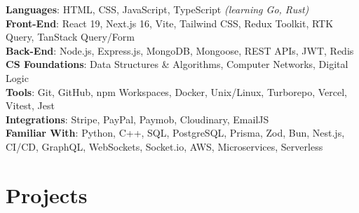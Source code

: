 \documentclass[letterpaper,11pt]{article}
\begin{document}
\begin{itemize}[leftmargin=0.15in, label={}]
  \small{\item{
      \textbf{Languages}{: HTML, CSS, JavaScript, TypeScript
        \emph{(learning Go, Rust)}}
      \\
      \textbf{Front-End}{: React 19, Next.js 16, Vite, Tailwind CSS, Redux
        Toolkit, RTK Query, TanStack Query/Form}
      \\
      \textbf{Back-End}{: Node.js, Express.js, MongoDB, Mongoose, REST APIs,
        JWT, Redis}
      \\
      \textbf{CS Foundations}{: Data Structures \& Algorithms, Computer
        Networks, Digital Logic}
      \\
      \textbf{Tools}{: Git, GitHub, npm Workspaces, Docker, Unix/Linux,
        Turborepo, Vercel, Vitest, Jest}
      \\ \textbf{Integrations}{: Stripe, PayPal, Paymob, Cloudinary, EmailJS} \\
      \textbf{Familiar With}{: Python, C++, SQL, PostgreSQL, Prisma, Zod, Bun,
        Nest.js, CI/CD, GraphQL, WebSockets, Socket.io, AWS, Microservices,
        Serverless}
    }}
\end{itemize}

\section{Projects}
\end{document}
